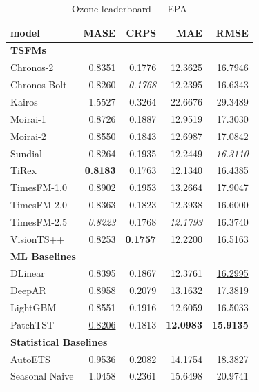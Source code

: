 \begin{table}[H]
\caption{Ozone leaderboard --- EPA}
\centering
\begin{small}
\begin{tabular}{lrrrr}
\toprule
model & MASE & CRPS & MAE & RMSE \\
\midrule
\multicolumn{5}{l}{\textbf{TSFMs}} \\
Chronos-2 & 0.8351 & 0.1776 & 12.3625 & 16.7946 \\
Chronos-Bolt & 0.8260 & \textit{0.1768} & 12.2395 & 16.6343 \\
Kairos & 1.5527 & 0.3264 & 22.6676 & 29.3489 \\
Moirai-1 & 0.8726 & 0.1887 & 12.9519 & 17.3030 \\
Moirai-2 & 0.8550 & 0.1843 & 12.6987 & 17.0842 \\
Sundial & 0.8264 & 0.1935 & 12.2449 & \textit{16.3110} \\
TiRex & \textbf{0.8183} & \underline{0.1763} & \underline{12.1340} & 16.4385 \\
TimesFM-1.0 & 0.8902 & 0.1953 & 13.2664 & 17.9047 \\
TimesFM-2.0 & 0.8363 & 0.1823 & 12.3938 & 16.6000 \\
TimesFM-2.5 & \textit{0.8223} & 0.1768 & \textit{12.1793} & 16.3740 \\
VisionTS++ & 0.8253 & \textbf{0.1757} & 12.2200 & 16.5163 \\
\midrule
\multicolumn{5}{l}{\textbf{ML Baselines}} \\
DLinear & 0.8395 & 0.1867 & 12.3761 & \underline{16.2995} \\
DeepAR & 0.8958 & 0.2079 & 13.1632 & 17.3819 \\
LightGBM & 0.8551 & 0.1916 & 12.6059 & 16.5033 \\
PatchTST & \underline{0.8206} & 0.1813 & \textbf{12.0983} & \textbf{15.9135} \\
\midrule
\multicolumn{5}{l}{\textbf{Statistical Baselines}} \\
AutoETS & 0.9536 & 0.2082 & 14.1754 & 18.3827 \\
Seasonal Naive & 1.0458 & 0.2361 & 15.6498 & 20.9741 \\
\bottomrule
\end{tabular}
\end{small}
\end{table}